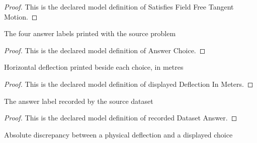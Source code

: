 \begin{proof}
  This is the declared model definition of Satisfies Field Free Tangent Motion.
\end{proof}
\begin{definition}
  \label{def:physics:phyx-mini-0957:phyxminiproblems-problemphyxmini0957-answerchoice}
  The four answer labels printed with the source problem
\end{definition}
\begin{proof}
  This is the declared model definition of Answer Choice.
\end{proof}
\begin{definition}
  \label{def:physics:phyx-mini-0957:phyxminiproblems-problemphyxmini0957-answerchoice-displayeddeflectioninmeters}
  Horizontal deflection printed beside each choice, in metres
\end{definition}
\begin{proof}
  This is the declared model definition of displayed Deflection In Meters.
\end{proof}
\begin{definition}
  \label{def:physics:phyx-mini-0957:phyxminiproblems-problemphyxmini0957-recordeddatasetanswer}
  The answer label recorded by the source dataset
\end{definition}
\begin{proof}
  This is the declared model definition of recorded Dataset Answer.
\end{proof}
\begin{definition}
  \label{def:physics:phyx-mini-0957:phyxminiproblems-problemphyxmini0957-displayeddeflectionerror}
  Absolute discrepancy between a physical deflection and a displayed choice
\end{definition}
